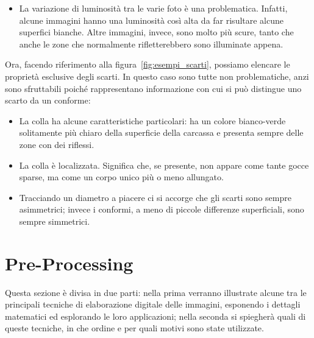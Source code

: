 \begin{itemize}

  \item La variazione di luminosità tra le varie foto è una problematica.
    Infatti, alcune immagini hanno una luminosità così alta da far risultare alcune superfici bianche.
    Altre immagini, invece, sono molto più scure, tanto che anche le zone che normalmente rifletterebbero sono illuminate appena.

\end{itemize}

Ora, facendo riferimento alla figura~\ref{fig:esempi_scarti}, possiamo elencare le proprietà esclusive degli scarti.
In questo caso sono tutte non problematiche, anzi sono sfruttabili poiché rappresentano informazione con cui si può distingue uno scarto da un conforme:
\begin{itemize}
  \item La colla ha alcune caratteristiche particolari: ha un colore bianco-verde solitamente più chiaro della superficie della carcassa e presenta sempre delle zone con dei riflessi.

  \item La colla è localizzata.
    Significa che, se presente, non appare come tante gocce sparse, ma come un corpo unico più o meno allungato.

  \item Tracciando un diametro a piacere ci si accorge che gli scarti sono sempre asimmetrici; invece i conformi, a meno di piccole differenze superficiali, sono sempre simmetrici.

\end{itemize}



\section{Pre-Processing}
Questa sezione è divisa in due parti: nella prima verranno illustrate alcune tra le principali tecniche di elaborazione digitale delle immagini, esponendo i dettagli matematici ed esplorando le loro applicazioni; nella seconda si spiegherà quali di queste tecniche, in che ordine e per quali motivi sono state utilizzate.

